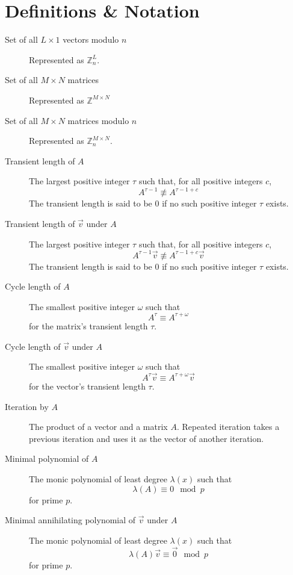 \documentclass[a4paper, reqno, 12pt]{amsart}
\begin{document}
	\section{Definitions \& Notation}
		\begin{description}
			\item[Set of all $L \times 1$ vectors modulo $n$] Represented as $\mathds{Z}_{n}^{L}$.
			
			\item[Set of all $M \times N$ matrices] Represented as $\mathds{Z}^{M \times N}$
			
			\item[Set of all $M \times N$ matrices modulo $n$] Represented as $\mathds{Z}_{n}^{M \times N}$.
			
			\item[Transient length of $A$] The largest positive integer $\tau$ such that, for all positive integers $c$,
			\[
				A^{\tau-1} \not\equiv A^{\tau - 1 + c}
			\]
			The transient length is said to be 0 if no such positive integer $\tau$ exists.
			
			\item[Transient length of $\vec{v}$ under $A$] The largest positive integer $\tau$ such that, for all positive integers $c$,
			\[
				A^{\tau-1}\vec{v} \not\equiv A^{\tau-1+c}\vec{v}
			\]
			The transient length is said to be 0 if no such positive integer $\tau$ exists.
			
			\item[Cycle length of $A$] The smallest positive integer $\omega$ such that
			\[
				A^{\tau} \equiv A^{\tau + \omega}
			\]
			for the matrix's transient length $\tau$.
			
			\item[Cycle length of $\vec{v}$ under $A$] The smallest positive integer $\omega$ such that
			\[
				A^{\tau}\vec{v} \equiv A^{\tau + \omega}\vec{v}
			\]
			for the vector's transient length $\tau$.
			
			\item[Iteration by $A$] The product of a vector and a matrix $A$. Repeated iteration takes a previous iteration and uses it as the vector of
			another iteration.
			
			\item[Minimal polynomial of $A$] The monic polynomial of least degree $\lambda(x)$ such that
			\[
				\lambda(A) \equiv 0 \mod{p}
			\]
			for prime $p$.
			
			\item[Minimal annihilating polynomial of $\vec{v}$ under $A$] The monic polynomial of least degree $\lambda(x)$ such that 
			\[
				\lambda(A)\vec{v} \equiv \vec{0} \mod{p}
			\]
			for prime $p$.
			

\end{description}
\end{document}
